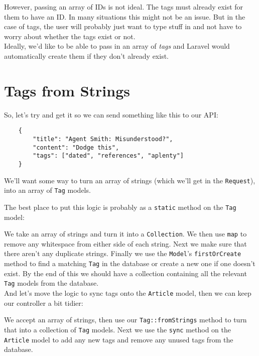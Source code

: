 However, passing an array of IDs is not ideal. The tags must already exist for them to have an ID. In many situations this might not be an issue. But in the case of tags, the user will probably just want to type stuff in and not have to worry about whether the tags exist or not.
\\

Ideally, we'd like to be able to pass in an array of \textit{tags} and Laravel would automatically create them if they don't already exist.


\section{Tags from Strings}

So, let's try and get it so we can send something like this to our API:

\begin{verbatim}
    {
        "title": "Agent Smith: Misunderstood?",
        "content": "Dodge this",
        "tags": ["dated", "references", "aplenty"]
    }
\end{verbatim}


We'll want some way to turn an array of strings (which we'll get in the \texttt{Request}), into an array of \texttt{Tag} models.

\pagebreak

The best place to put this logic is probably as a \texttt{static} method on the \texttt{Tag} model:


We take an array of strings and turn it into a \texttt{Collection}. We then use \texttt{map} to remove any whitespace from either side of each string. Next we make sure that there aren't any duplicate strings. Finally we use the \texttt{Model}'s \texttt{firstOrCreate} method to find a matching \texttt{Tag} in the database or create a new one if one doesn't exist. By the end of this we should have a collection containing all the relevant \texttt{Tag} models from the database.
\\

And let's move the logic to sync tags onto the \texttt{Article} model, then we can keep our controller a bit tidier:


We accept an array of strings, then use our \texttt{Tag::fromStrings} method to turn that into a collection of \texttt{Tag} models. Next we use the \texttt{sync} method on the \texttt{Article} model to add any new tags and remove any unused tags from the database.

